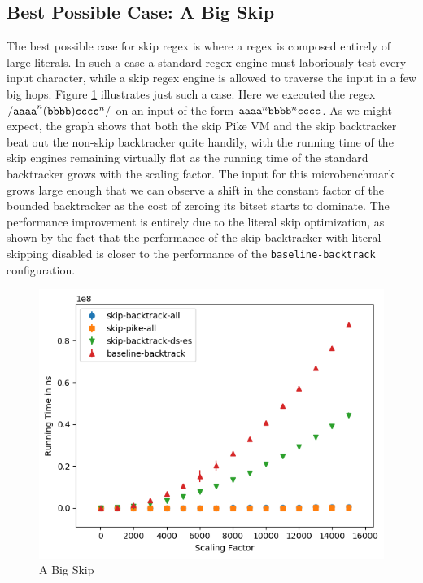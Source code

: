 
\subsection{Best Possible Case: A Big Skip}

The best possible case for skip regex is where a regex is composed
entirely of large literals. In such a case a standard regex engine
must laboriously test every input character, while a skip regex
engine is allowed to traverse the input in a few big hops. Figure
\ref{fig:a:big:skip} illustrates just such a case. Here we executed the
regex ${\tt /aaaa}^n{\tt (bbbb)}{\tt cccc}^n{\tt /}$ on
an input of the form ${\tt aaaa}^n{\tt bbbb}^n{\tt cccc}$.
As we might expect,
the graph shows that both the skip Pike VM and the skip backtracker
beat out the non-skip backtracker quite handily, with the running time
of the skip engines remaining virtually flat as the running
time of the standard backtracker grows with the scaling factor.
The input for this microbenchmark grows large enough that we can
observe a shift in the constant factor of the bounded backtracker
as the cost of zeroing its bitset starts to dominate.
The performance improvement is entirely due to the literal skip
optimization, as shown by the fact that the performance of the skip
backtracker with literal skipping disabled is closer to the performance
of the \verb'baseline-backtrack' configuration.

\begin{figure}
\caption{A Big Skip}
\label{fig:a:big:skip}

\includegraphics{resources/a-big-skip.png}
\end{figure}

